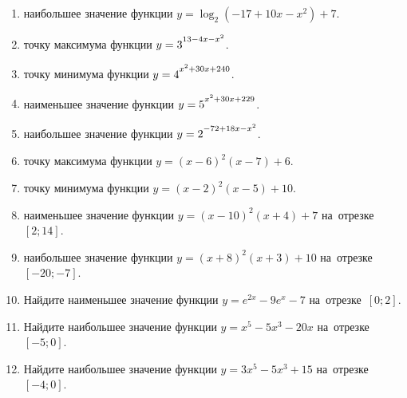 \documentclass[a4paper,10pt]{article}
\begin{document}
\begin{enumerate}
\item {} наибольшее значение функции $y=\log_2\left(-17+10x-x^2\right)+7$.

\item {} точку максимума функции $y=3\strut^{13-4x-x^2}$.

\item {} точку минимума функции $y=4\strut^{x^2+30x+240}$.

\item {} наименьшее значение функции $y=5\strut^{x^2+30x+229}$.

\item {} наибольшее значение функции $y=2\strut^{-72+18x-x^2}$.

\item {} точку максимума функции $y=\left(x-6\right)^2\left(x-7\right)+6$.

\item {} точку минимума функции $y=\left(x-2\right)^2\left(x-5\right)+10$.

\item {} наименьшее значение функции $y=\left(x-10\right)^2\left(x+4\right)+7$ на~отрезке~$\left[2;14\right]$.

\item {} наибольшее значение функции $y=\left(x+8\right)^2\left(x+3\right)+10$ на~отрезке~$\left[-20;-7\right]$.

\item Найдите наименьшее значение функции $y=e^{2x}-9e^x-7$ на~отрезке~$\left[0;2\right]$.

\item Найдите наибольшее значение функции $y=x^5-5x^3-20x$ на~отрезке~$\left[-5;0\right]$.

\item Найдите наибольшее значение функции $y=3x^5-5x^3+15$ на~отрезке~$\left[-4;0\right]$.

\end{enumerate}
\end{document}
